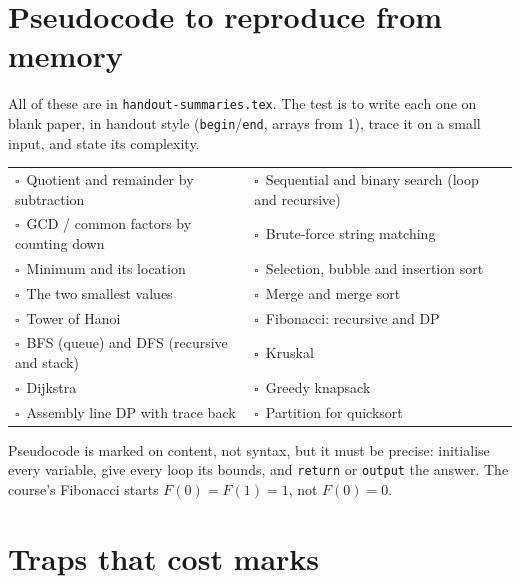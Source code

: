 \documentclass{fkt-notes}
\newif\ifpublic
\newcommand{\priv}[2]{\ifpublic#2\else#1\fi}
\newcommand{\cb}{$\square$\ }
\begin{document}
\section{Pseudocode to reproduce from memory}
\label{sec:pseudo}

All of these are in \priv{\texttt{handout-summaries.tex}}{the handouts}. The test is to write each one on blank paper, in handout style (\texttt{begin}/\texttt{end}, arrays from 1), trace it on a small input, and state its complexity.

\begin{center}
\small
\begin{tabular}{@{}p{7.2cm}p{7cm}@{}}
\cb Quotient and remainder by subtraction & \cb Sequential and binary search (loop and recursive) \\
\cb GCD / common factors by counting down & \cb Brute-force string matching \\
\cb Minimum and its location & \cb Selection, bubble and insertion sort \\
\cb The two smallest values & \cb Merge and merge sort \\
\cb Tower of Hanoi & \cb Fibonacci: recursive and DP \\
\cb BFS (queue) and DFS (recursive and stack) & \cb Kruskal \\
\cb Dijkstra & \cb Greedy knapsack \\
\cb Assembly line DP with trace back & \cb Partition for quicksort \\
\end{tabular}
\end{center}

\begin{trap}
Pseudocode is marked on content, not syntax, but it must be precise: initialise every variable, give every loop its bounds, and \texttt{return} or \texttt{output} the answer. The course's Fibonacci starts $F(0)=F(1)=1$, not $F(0)=0$.
\end{trap}

\section{Traps that cost marks}
\end{document}
